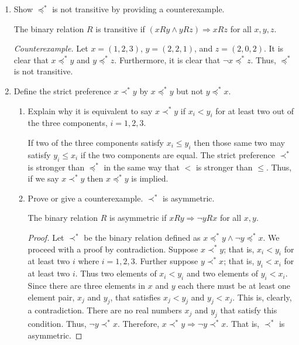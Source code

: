 \documentclass[a4paper, 12pt]{config/homework}
\begin{document}
\begin{enumerate}
\begin{enumerate}[label= (\alph*)]
\item Show \(\preccurlyeq^*\) is not transitive by providing a counterexample.

The binary relation \(R\) is transitive if \(( xRy \land yRz) \Rightarrow xRz\) for all \(x,y,z\).

\textit{Counterexample.} Let \(x=(1,2,3)\), \(y=(2,2,1)\), and \(z=(2,0,2)\). It is clear that \( x \preccurlyeq^* y\) and \( y \preccurlyeq^* z\). Furthermore, it is clear that \(\neg x \preccurlyeq^* z\). Thus, \(\preccurlyeq^*\) is not transitive.

\pagebreak
\item Define the strict preference \(x \prec^* y\) by \(x \preccurlyeq^* y\) but not \(y \preccurlyeq^* x\).
\begin{enumerate}[label= \roman*.]
\item Explain why it is equivalent to say \(x \prec^* y\) if \(x_i < y_i\) for at least two out of the three components, \(i=1,2,3\).

If two of the three components satisfy \(x_i \le y_i\) then those same two may satisfy \(y_i \le x_i\) if the two components are equal. The strict preference \(\prec^*\) is stronger than \(\preccurlyeq^*\) in the same way that \(<\) is stronger than \(\le \). Thus, if we say \(x \prec^* y\) then \(x \preccurlyeq^* y\) is implied.

\item Prove or give a counterexample. \(\prec^*\) is asymmetric.

The binary relation \(R\) is asymmetric if \(xRy \Rightarrow \neg yRx\) for all \(x,y\).

\begin{proof}
Let \(\prec^*\) be the binary relation defined as \(x \preccurlyeq^* y \land \neg y \preccurlyeq^* x\). We proceed with a proof by contradiction. Suppose \(x \prec^* y\); that is, \(x_i < y_i\) for at least two \(i\) where \(i = 1,2,3\). Further suppose \(y \prec^* x\); that is, \(y_i < x_i\) for at least two \(i\). Thus two elements of \(x_i < y_i\) and two elements of \(y_i < x_i\). Since there are three elements in \(x\) and \(y\) each there must be at least one element pair, \(x_j\) and \(y_j\), that satisfies \(x_j < y_j\) and \(y_j < x_j\). This is, clearly, a contradiction. There are no real numbers \(x_j\) and \(y_j\) that satisfy this condition. Thus, \(\neg y \prec^* x\). Therefore, \(x \prec^* y \Rightarrow \neg y \prec^* x\). That is, \(\prec^*\) is asymmetric.
\end{proof}


\end{enumerate}
\end{enumerate}
\end{enumerate}
\end{document}

